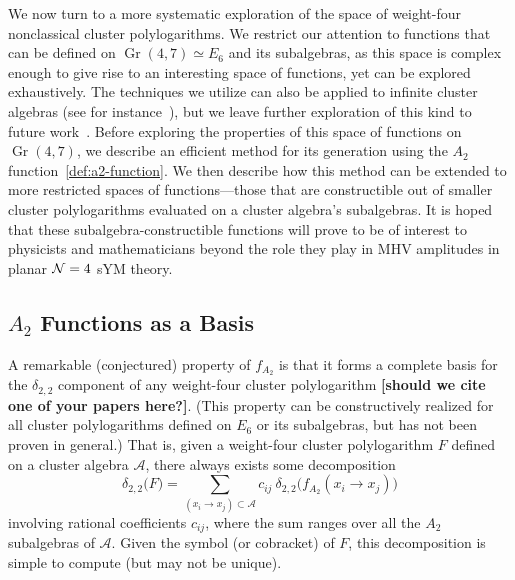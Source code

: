 \documentclass[11pt]{article}
\DeclareMathOperator{\Gr}{Gr}
\def\a{\mathcal{A}}
\def\draftnote#1{{\bf [#1]}}
\def\pdfeq#1{\texorpdfstring{$#1$}{a}}
\begin{document}
We now turn to a more systematic exploration of the space of weight-four nonclassical cluster polylogarithms. We restrict our attention to functions that can be defined on $\Gr(4,7) \simeq E_6$ and its subalgebras, as this space is complex enough to give rise to an interesting space of functions, yet can be explored exhaustively. The techniques we utilize can also be applied to infinite cluster algebras (see for instance~\cite{Golden:2014xqa}), but we leave further exploration of this kind to future work~\cite{cluster_subalgebras_ii}. Before exploring the properties of this space of functions on $\Gr(4,7)$, we describe an efficient method for its generation using the $A_2$ function~\eqref{def:a2-function}. We then describe how this method can be extended to more restricted spaces of functions---those that are constructible out of smaller cluster polylogarithms evaluated on a cluster algebra's subalgebras. It is hoped that these subalgebra-constructible functions will prove to be of interest to physicists and mathematicians beyond the role they play in MHV amplitudes in planar ${\cal N}=4$ sYM theory. 

\subsection{\pdfeq{A_2} Functions as a Basis}

A remarkable (conjectured) property of $f_{A_2}$ is that it forms a complete basis for the $\delta_{2,2}$ component of any weight-four cluster polylogarithm \draftnote{should we cite one of your papers here?}. (This property can be constructively realized for all cluster polylogarithms defined on $E_6$ or its subalgebras, but has not been proven in general.) That is, given a weight-four cluster polylogarithm $F$ defined on a cluster algebra $\a$, there always exists some decomposition
\begin{equation}\label{eq:a2-decomp}
	\delta_{2,2} \big(F\big) = \sum_{(x_i\to x_j) \subset \a} c_{ij} ~\delta_{2,2}\big(f_{A_2}(x_i \to x_j) \big)
\end{equation}
involving rational coefficients $c_{ij}$, where the sum ranges over all the $A_2$ subalgebras of $\a$. Given the symbol (or cobracket) of $F$, this decomposition is simple to compute (but may not be unique). 
\end{document}
